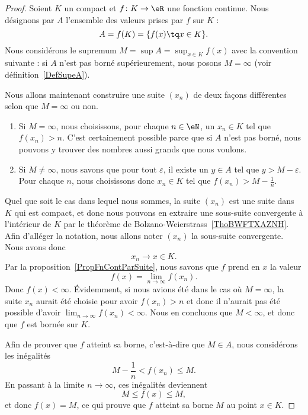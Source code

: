 \begin{proof}
	Soient \( K\) un compact et \( f\colon K\to \eR\) une fonction continue. Nous désignons par \( A\) l'ensemble des valeurs prises par \( f\) sur \( K\) :
	\begin{equation}
		A=f(K)=\{ f(x)\tq x\in K \}.
	\end{equation}
	Nous considérons le supremum \( M=\sup A=\sup_{x\in K}f(x)\) avec la convention suivante : si \( A\) n'est pas borné supérieurement, nous posons \( M=\infty\) (voir définition~\ref{DefSupeA}).

	Nous allons maintenant construire une suite \( (x_n)\) de deux façons différentes selon que \( M=\infty\) ou non.
	\begin{enumerate}
		\item
		      Si \( M=\infty\), nous choisissons, pour chaque \( n\in\eN\), un \( x_n\in K\) tel que \( f(x_n)>n\). C'est certainement possible parce que si \( A\) n'est pas borné, nous pouvons y trouver des nombres aussi grands que nous voulons.
		\item
		      Si \( M\neq\infty\), nous savons que pour tout \( \varepsilon\), il existe un \( y\in A\) tel que \( y>M-\varepsilon\). Pour chaque \( n\), nous choisissons donc \( x_n\in K\) tel que \( f(x_n)>M-\frac{1}{ n }\).
	\end{enumerate}
	Quel que soit le cas dans lequel nous sommes, la suite \( (x_n)\) est une suite dans \( K\) qui est compact, et donc nous pouvons en extraire une sous-suite convergente à l'intérieur de \( K\) par le théorème de Bolzano-Weierstrass~\ref{ThoBWFTXAZNH}. Afin d'alléger la notation, nous allons noter \( (x_n)\) la sous-suite convergente. Nous avons donc
	\begin{equation}
		x_n\to x\in K.
	\end{equation}
	Par la proposition~\ref{PropFnContParSuite}, nous savons que \( f\) prend en \( x\) la valeur
	\begin{equation}
		f(x)=\lim_{n\to \infty} f(x_n).
	\end{equation}
	Donc \( f(x)<\infty\). Évidemment, si nous avions été dans le cas où \( M=\infty\), la suite \( x_n\) aurait été choisie pour avoir \( f(x_n)>n\) et donc il n'aurait pas été possible d'avoir \( \lim_{n\to \infty} f(x_n)<\infty\). Nous en concluons que \( M<\infty\), et donc que \( f\) est bornée sur \( K\).

	Afin de prouver que \( f\) atteint sa borne, c'est-à-dire que \( M\in A\), nous considérons les inégalités
	\begin{equation}
		M-\frac{1}{ n }<f(x_n)\leq M.
	\end{equation}
	En passant à la limite \( n\to \infty\), ces inégalités deviennent
	\begin{equation}
		M\leq f(x)\leq M,
	\end{equation}
	et donc \( f(x)=M\), ce qui prouve que \( f\) atteint sa borne \( M\) au point \( x\in K\).
\end{proof}

